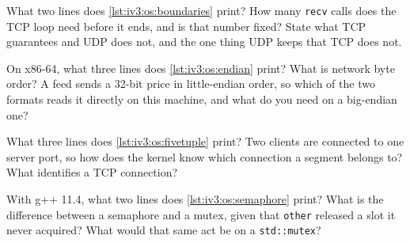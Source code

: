 \begin{question}\label{iq:iv3:operating-systems-concurrency-and-networks:4}
What two lines does \cref{lst:iv3:os:boundaries} print? How many \texttt{recv} calls does the TCP loop need before it ends, and is that number fixed? State what TCP guarantees and UDP does not, and the one thing UDP keeps that TCP does not.
\label{lst:iv3:os:boundaries}
\end{question}

\begin{question}\label{iq:iv3:operating-systems-concurrency-and-networks:5}
On x86-64, what three lines does \cref{lst:iv3:os:endian} print? What is network byte order? A feed sends a 32-bit price in little-endian order, so which of the two formats reads it directly on this machine, and what do you need on a big-endian one?
\label{lst:iv3:os:endian}
\end{question}

\begin{question}\label{iq:iv3:operating-systems-concurrency-and-networks:6}
What three lines does \cref{lst:iv3:os:fivetuple} print? Two clients are connected to one server port, so how does the kernel know which connection a segment belongs to? What identifies a TCP connection?
\label{lst:iv3:os:fivetuple}
\end{question}

\begin{question}\label{iq:iv3:operating-systems-concurrency-and-networks:7}
With g++ 11.4, what two lines does \cref{lst:iv3:os:semaphore} print? What is the difference between a semaphore and a mutex, given that \texttt{other} released a slot it never acquired? What would that same act be on a \texttt{std::mutex}?
\label{lst:iv3:os:semaphore}
\end{question}


